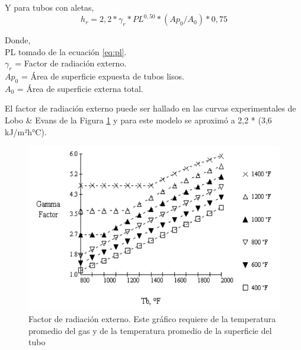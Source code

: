 \par Y para tubos con aletas,
\begin{equation}
h_r = 2,2 *\gamma_r *PL^{0,50} *(Ap_0/A_0) *0,75
\end{equation}

\par Donde,\\
PL tomado de la ecuación \ref{eq:pl}.\\
$\gamma_r$ = Factor de radiación externo.\\
$Ap_0$ = Área de superficie expuesta de tubos lisos.\\
$A_0$ = Área de superficie externa total. \\
\par El factor de radiación externo puede ser hallado en las curvas experimentales de Lobo \& Evans de la Figura \ref{fig:gamma} y para este modelo se aproximó a 2,2 * (3,6 kJ/m²h°C).
\begin{figure}[H]
\begin{center}
\includegraphics[scale=0.40]{images/gamma}
\caption[Factor de radiación externo]{Factor de radiación externo. Este gráfico requiere de la temperatura promedio del gas y de la temperatura promedio de la superficie del tubo \cite{bib:rad}}
\label{fig:gamma}
\end{center}
\end{figure}

